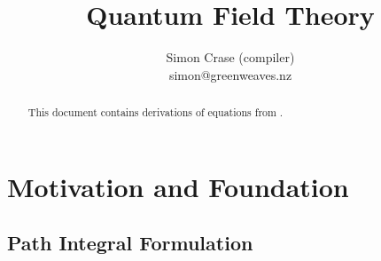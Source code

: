 \documentclass[]{article}
\title{Quantum Field Theory}
\author{Simon Crase (compiler)\\simon@greenweaves.nz}
\begin{document}
\maketitle

\begin{abstract}

This document contains derivations of equations from \cite{zee2010quantum}.

\end{abstract}

\tableofcontents

\section{Motivation and Foundation}

\subsection{Path Integral Formulation}
\end{document}
